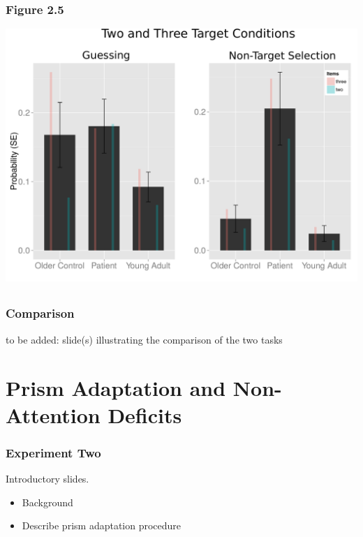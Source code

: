 \documentclass{beamer}
\begin{document}
 
 \subsection*{}
 \begin{frame}
	 \frametitle{Comparison}
    to be added: slide(s) illustrating the comparison of the two tasks
 \end{frame}



 \section[Prisms]{Prism Adaptation and Non-Attention Deficits} 

 \begin{frame}
  \frametitle{Experiment Two}
 Introductory slides. 
 \begin{itemize}
	 \item Background
	 \item Describe prism adaptation procedure
 \end{itemize}

 \end{frame}
\end{document}
